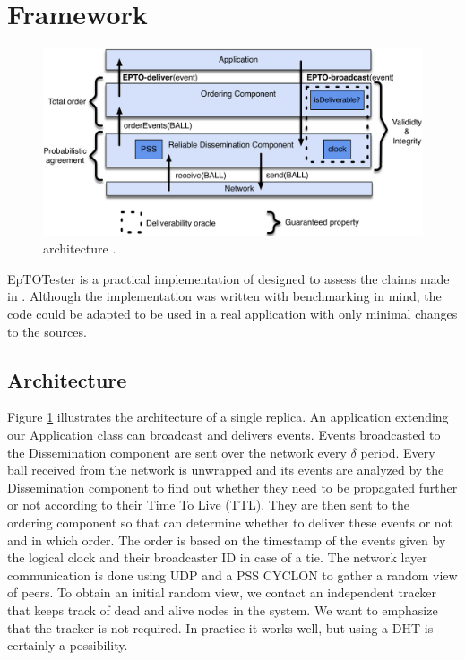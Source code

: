 \section{Framework}
\label{sec:epto}
\begin{figure}[htp]
	\includegraphics[width=\linewidth]{figures/architecture.pdf}
	\caption{\epto architecture \autocite{matos2015epto}.}
	\label{fig:epto-architecture}
\end{figure}
EpTOTester is a practical implementation of \epto designed to assess the claims made in \autocite{matos2015epto}. Although the implementation was written with benchmarking in mind, the code could be adapted to be used in a real application with only minimal changes to the sources.
\subsection{Architecture}
Figure \ref{fig:epto-architecture} illustrates the architecture of a single replica. An application extending our Application class can broadcast and delivers events. Events broadcasted to the Dissemination component are sent over the network every $\delta$ period. Every ball received from the network is unwrapped and its events are analyzed by the Dissemination component to find out whether they need to be propagated further or not according to their Time To Live (TTL). They are then sent to the ordering component so that \epto can determine whether to deliver these events or not and in which order. The order is based on the timestamp of the events given by the logical clock and their broadcaster ID in case of a tie. The network layer communication is done using UDP and a PSS CYCLON to gather a random view of peers. To obtain an initial random view, we contact an independent tracker that keeps track of dead and alive nodes in the system. We want to emphasize that the tracker is not required. In practice it works well, but using a DHT is certainly a possibility.

